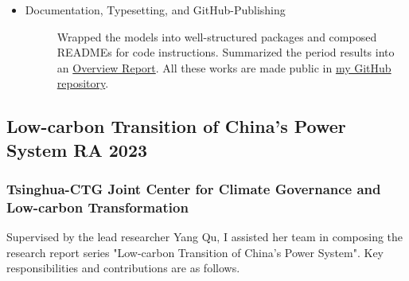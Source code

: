 \documentclass[a4paper]{article}
\newcommand{\MFG}{\href{https://github.com/OrangeAoo/Multi-Period-Compliance-MFG-FBSDEs}{my GitHub repository}}
\begin{document}
\begin{itemize}
\begin{description}
    \end{description}
    \item \begin{description}
        \item[Documentation, Typesetting, and GitHub-Publishing] Wrapped the models into well-structured packages and composed READMEs for code instructions. Summarized the period results into an \href{https://github.com/OrangeAoo/Multi-Compliance-MFG-FBSDEs/blob/FBSDE/FinalReports/ReportOverview-MFG-FBSDE.pdf}{Overview Report}. All these works are made public in \MFG. %
    \end{description}
\end{itemize}

\newpage
\subsection{Low-carbon Transition of China's Power System \normalfont \hfill RA \hfill 2023} 
\subsubsection{Tsinghua-CTG Joint Center for Climate Governance and Low-carbon Transformation} 
\vspace{3pt}
\begin{adjustwidth}{10pt}{}
    Supervised by the lead researcher Yang Qu, I assisted her team in composing the research report series "Low-carbon Transition of China’s Power System". Key responsibilities and contributions are as follows. 
\end{adjustwidth}
\end{document}
